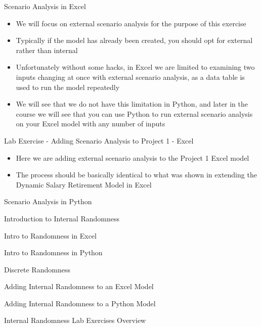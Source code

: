 \documentclass[]{article}
\begin{document}
\begin{section}{Scenario Analysis in Excel}
\begin{itemize}
\item We will focus on external scenario analysis for the purpose of this exercise
\item Typically if the model has already been created, you should opt for external rather than internal
\item Unfortunately without some hacks, in Excel we are limited to examining two inputs changing at once with external scenario analysis, as a data table is used to run the model repeatedly
\item We will see that we do not have this limitation in Python, and later in the course we will see that you can use Python to run external scenario analysis on your Excel model with any number of inputs
\end{itemize}
\end{section}
\begin{section}{Lab Exercise - Adding Scenario Analysis to Project 1 - Excel}
\begin{itemize}
\item Here we are adding external scenario analysis to the Project 1 Excel model
\item The process should be basically identical to what was shown in extending the Dynamic Salary Retirement Model in Excel
\end{itemize}
\end{section}
\begin{section}{Scenario Analysis in Python}

\end{section}
\begin{section}{Introduction to Internal Randomness}

\end{section}
\begin{section}{Intro to Randomness in Excel}

\end{section}
\begin{section}{Intro to Randomness in Python}

\end{section}
\begin{section}{Discrete Randomness}

\end{section}
\begin{section}{Adding Internal Randomness to an Excel Model}

\end{section}
\begin{section}{Adding Internal Randomness to a Python Model}

\end{section}
\begin{section}{Internal Randomness Lab Exercises Overview}

\end{section}
\end{document}

